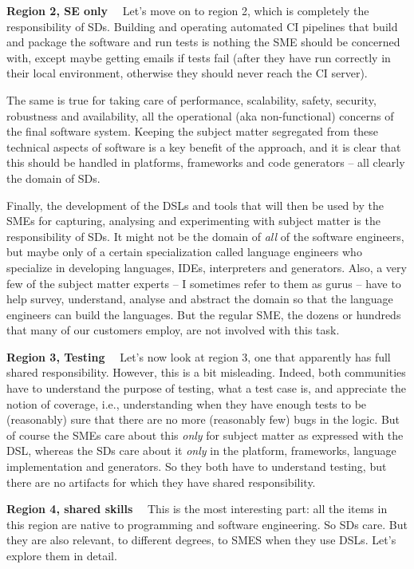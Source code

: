 \documentclass[runningheads]{llncs}
\newcommand\parhead[1]{\vspace{1mm}\noindent\textbf{{#1}}\ \ }
\begin{document}
\parhead{Region 2, SE only} Let's move on to region 2, which is completely the
responsibility of SDs.
Building and operating automated CI pipelines that build and package the
software and run tests is nothing the SME should be concerned with, except maybe
getting emails if tests fail (after they have run correctly in their local
environment, otherwise they should never reach the CI server).
 
The same is true for taking care of performance, scalability, 
safety, security, robustness and availability, all the operational
(aka non-functional) concerns of the final software system. Keeping the
subject matter segregated from these technical aspects of software is
a key benefit of the approach, and it is clear that this should be 
handled in platforms, frameworks and code generators -- all clearly
the domain of SDs.

Finally, the development of the DSLs and tools that will then be used by the
SMEs for capturing, analysing and experimenting with subject matter is the
responsibility of SDs. It might not be the domain of \emph{all} of the software
engineers, but maybe only of a certain specialization called language engineers
who specialize in developing languages, IDEs, interpreters and generators. Also,
a very few of the subject matter experts -- I sometimes refer to them as gurus
-- have to help survey, understand, analyse and abstract the domain so that the
language engineers can build the languages. But the regular SME, the dozens or
hundreds that many of our customers employ, are not involved with this task.

\parhead{Region 3, Testing} Let's now look at region 3, one that apparently has
full shared responsibility. However, this is a bit misleading. Indeed, both
communities have to understand the purpose of testing, what a test case is,
and appreciate the notion of coverage, i.e., understanding when they have enough
tests to be (reasonably) sure that there are no more (reasonably few) bugs in
the logic. But of course the SMEs care about this \emph{only} for subject matter
as expressed with the DSL, whereas the SDs care about it \emph{only} in the platform,
frameworks, language implementation and generators. So they both have to
understand testing, but there are no artifacts for which they
have shared responsibility.

\parhead{Region 4, shared skills} This is the most interesting part: all the items
in this region are native to programming and software engineering. So SDs care.
But they are also relevant, to different degrees, to SMES when they use DSLs.
Let's explore them in detail.
\end{document}
